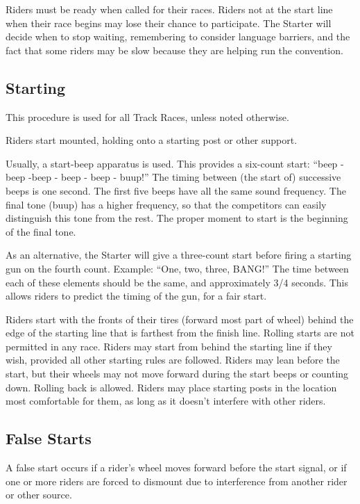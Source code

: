 Riders must be ready when called for their races.
Riders not at the start line when their race begins may lose their chance to participate.
The Starter will decide when to stop waiting, remembering to consider language barriers, and the fact that some riders may be slow because they are helping run the convention.

\subsection{Starting \label{subsec:track-field_starting}}

This procedure is used for all Track Races, unless noted otherwise.

Riders start mounted, holding onto a starting post or other support.

Usually, a start-beep apparatus is used.
This provides a six-count start: ``beep - beep -beep - beep - beep - buup!''
The timing between (the start of) successive beeps is one second.
The first five beeps have all the same sound frequency.
The final tone (buup) has a higher frequency, so that the competitors can easily distinguish this tone from the rest. The proper moment to start is the beginning of the final tone.

As an alternative, the Starter will give a three-count start before firing a starting gun on the fourth count.
Example: ``One, two, three, BANG!''
The time between each of these elements should be the same, and approximately 3/4 seconds.
This allows riders to predict the timing of the gun, for a fair start.

Riders start with the fronts of their tires (forward most part of wheel) behind the edge of the starting line that is farthest from the finish line.
Rolling starts are not permitted in any race.
Riders may start from behind the starting line if they wish, provided all other starting rules are followed.
Riders may lean before the start, but their wheels may not move forward during the start beeps or counting down.
Rolling back is allowed.
Riders may place starting posts in the location most comfortable for them, as long as it doesn't interfere with other riders.

\subsection{False Starts \label{subsec:track-field_false-starts}}

A false start occurs if a rider's wheel moves forward before the start signal, or if one or more riders are forced to dismount due to interference from another rider or other source.

